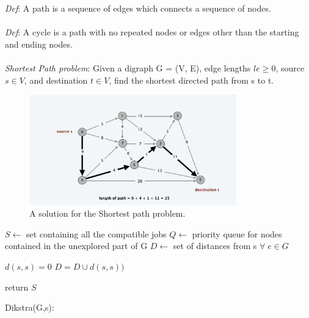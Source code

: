 \documentclass[11pt]{article}
\begin{document}
\emph{Def}: A path is a sequence of edges which connects a sequence of nodes.\\\\
\emph{Def}: A cycle is a path with no repeated nodes or edges other than the
starting and ending nodes.\\\\
\emph{Shortest Path problem}: Given a digraph G = (V, E), edge lengths $le \geq 0$, source $s \in V$, and destination $t \in V$, find the shortest directed path from s to t.

\begin{figure}[H]
		\centering
		\includegraphics[width=0.8\textwidth ]{dikstra}
		\caption{A solution for the Shortest path problem.}
\end{figure}

\begin{algorithm}[H]
\SetAlgoLined
\small
{}
\BlankLine

$S \leftarrow$ set containing all the compatible jobs\;
$Q \leftarrow$ priority queue for nodes contained in the unexplored part of G \;
$D \leftarrow$ set of distances from s $\forall \; e \in G$

\BlankLine

$d(s,s) = 0$\;
$D = D \cup d(s,s))$\;

\BlankLine


\BlankLine


return $S$\;
\caption{Dikstra(G,s):}
\end{algorithm}
\end{document}
